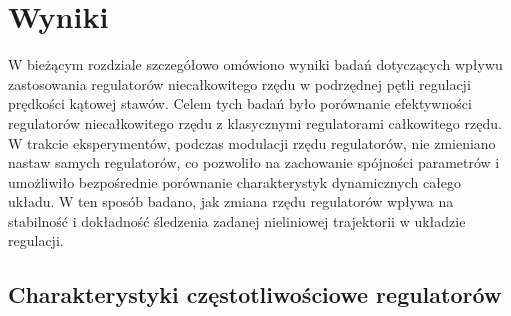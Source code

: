 \documentclass[journal,twoside,web]{ieeecolor}
\begin{document}
\section{Wyniki}
W bieżącym rozdziale szczegółowo omówiono wyniki badań dotyczących wpływu zastosowania regulatorów niecałkowitego rzędu w podrzędnej pętli regulacji prędkości kątowej stawów. Celem tych badań było porównanie efektywności regulatorów niecałkowitego rzędu z klasycznymi regulatorami całkowitego rzędu. W trakcie eksperymentów, podczas modulacji rzędu regulatorów, nie zmieniano nastaw samych regulatorów, co pozwoliło na zachowanie spójności parametrów i umożliwiło bezpośrednie porównanie charakterystyk dynamicznych całego układu. W ten sposób badano, jak zmiana rzędu regulatorów wpływa na stabilność i dokładność śledzenia zadanej nieliniowej trajektorii w układzie regulacji. 

\subsection{Charakterystyki częstotliwościowe regulatorów}
\end{document}
